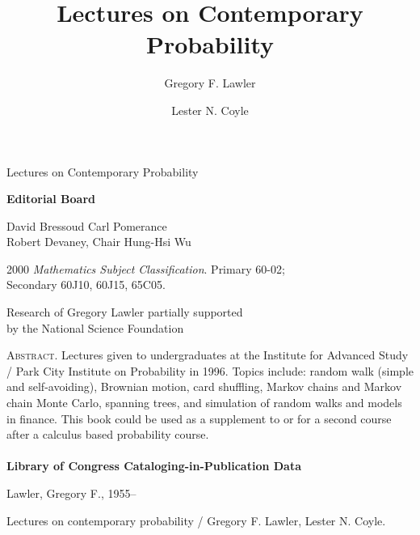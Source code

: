 \documentclass{stml-l}
\newenvironment{copyrightpage}{\clearpage\null\thispagestyle{empty}}{\thispagestyle{empty}\clearpage}
\theoremstyle{definition}
\numberwithin{equation}{chapter}
\numberwithin{figure}{chapter}
\numberwithin{figure}{section}
\begin{document}
\begin{titlepage}
Lectures on Contemporary Probability
\end{titlepage}

\title{Lectures on Contemporary Probability}

\author{Gregory F. Lawler}

\author{Lester N. Coyle}

\maketitle

\begin{copyrightpage}
\begin{center}
\textbf{Editorial Board}
\end{center}

\begin{center}
David Bressoud \hfill Carl Pomerance\\
Robert Devaney, Chair \hfill Hung-Hsi Wu
\end{center}

\begin{center}
2000 \emph{Mathematics Subject Classification}. Primary 60-02;\\
Secondary 60J10, 60J15, 65C05.
\end{center}

\begin{center}
Research of Gregory Lawler partially supported\\
by the National Science Foundation
\end{center}

\noindent \textsc{Abstract.} Lectures given to undergraduates at the Institute for Advanced Study / Park City Institute on Probability in 1996. Topics include: random walk (simple and self-avoiding), Brownian motion, card shuffling, Markov chains and Markov chain Monte Carlo, spanning trees, and simulation of random walks and models in finance. This book could be used as a supplement to or for a second course after a calculus based probability course.\\

\hrulefill\\

\noindent \textbf{Library of Congress Cataloging-in-Publication Data}

\noindent Lawler, Gregory F., 1955--

Lectures on contemporary probability / Gregory F. Lawler, Lester N. Coyle.


\end{copyrightpage}
\end{document}
